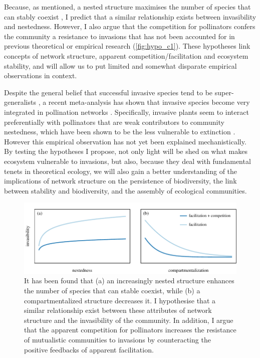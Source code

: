 \documentclass[a4paper]{article}
\begin{document}
Because, as mentioned, a nested structure maximises the number of species that can stably coexist \cite{Bastolla2009}, I predict that a similar relationship exists between invasibility and nestedness.
However, I also argue that the competition for pollinators confers the community a resistance to invasions that has not been accounted for in previous theoretical or empirical research (\autoref{fig:hypo_c1}).
These hypotheses link concepts of network structure, apparent competition/facilitation and ecosystem stability, and will allow us to put limited and somewhat disparate empirical observations in context.

Despite the general belief that successful invasive species tend to be super-generalists \cite{Richardson2000, Aizen2008, Vila2009, Albrecht2014}, a recent meta-analysis has shown that invasive species become very integrated in pollination networks \cite{Stouffer2014}.
Specifically, invasive plants seem to interact preferentially with pollinators that are weak contributors to community nestedness, which have been shown to be the less vulnerable to extinction \cite{Saavedra2011, Stouffer2014}.
However this empirical observation has not yet been explained mechanistically.
By testing the hypotheses I propose, not only light will be shed on what makes ecosystem vulnerable to invasions, but also, because they deal with fundamental tenets in theoretical ecology, we will also gain a better understanding of the implications of network structure on the persistence of biodiversity, the link between stability and biodiversity, and the assembly of ecological communities.

\begin{figure}[tbp]
  \includegraphics{hypo_c1}
  \caption{
  \label{fig:hypo_c1}
  It has been found that (a) an increasingly nested structure enhances the number of species that can stable coexist, while (b) a compartmentalized structure decreases it.
  I hypothesise that a similar relationship exist between these attributes of network structure and the invasibility of the community.
  In addition, I argue that the apparent competition for pollinators increases the resistance of mutualistic communities to invasions by counteracting the positive feedbacks of apparent facilitation.}
\end{figure}
\end{document}

